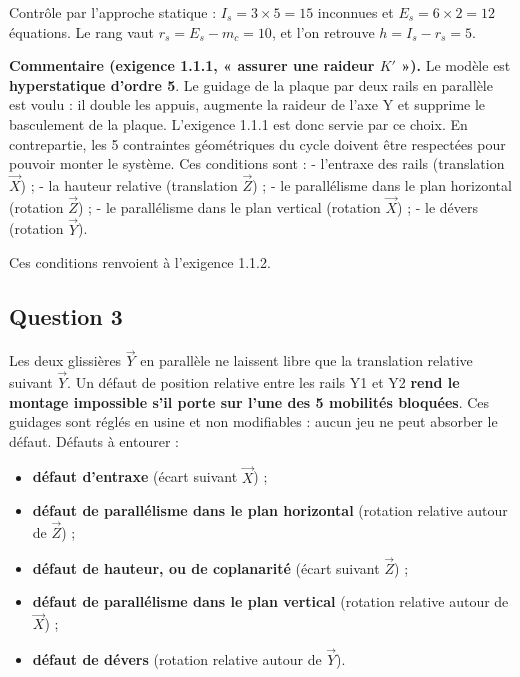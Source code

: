 \documentclass[11pt,a4paper]{article}
\providecommand{\tightlist}{\setlength{\itemsep}{0pt}\setlength{\parskip}{0pt}}
\newcommand{\equationajustee}[1]{%
  \sbox{\boiteequation}{$\displaystyle #1$}%
  \ifdim\wd\boiteequation>\linewidth
    \[\resizebox{\linewidth}{!}{\usebox{\boiteequation}}\]%
  \else
    \[#1\]%
  \fi}
\begin{document}
\equationajustee{\boxed{h = 5}}

Contrôle par l'approche statique : \(I_s = 3\times5 = 15\) inconnues et \(E_s = 6\times2 = 12\) équations. Le rang vaut \(r_s = E_s - m_c = 10\), et l'on retrouve \(h = I_s - r_s = 5\).

\textbf{Commentaire (exigence 1.1.1, « assurer une raideur \(K'\) »).} Le modèle est \textbf{hyperstatique d'ordre 5}. Le guidage de la plaque par deux rails en parallèle est voulu : il double les appuis, augmente la raideur de l'axe Y et supprime le basculement de la plaque. L'exigence 1.1.1 est donc servie par ce choix. En contrepartie, les 5 contraintes géométriques du cycle doivent être respectées pour pouvoir monter le système. Ces conditions sont :
- l'entraxe des rails (translation \(\vec X\)) ;
- la hauteur relative (translation \(\vec Z\)) ;
- le parallélisme dans le plan horizontal (rotation \(\vec Z\)) ;
- le parallélisme dans le plan vertical (rotation \(\vec X\)) ;
- le dévers (rotation \(\vec Y\)).

Ces conditions renvoient à l'exigence 1.1.2.

\hypertarget{question-3}{%
\subsection{Question 3}\label{question-3}}

Les deux glissières \(\vec Y\) en parallèle ne laissent libre que la translation relative suivant \(\vec Y\). Un défaut de position relative entre les rails Y1 et Y2 \textbf{rend le montage impossible s'il porte sur l'une des 5 mobilités bloquées}. Ces guidages sont réglés en usine et non modifiables : aucun jeu ne peut absorber le défaut. Défauts à entourer :

\begin{itemize}
\tightlist
\item
  \textbf{défaut d'entraxe} (écart suivant \(\vec X\)) ;
\item
  \textbf{défaut de parallélisme dans le plan horizontal} (rotation relative autour de \(\vec Z\)) ;
\item
  \textbf{défaut de hauteur, ou de coplanarité} (écart suivant \(\vec Z\)) ;
\item
  \textbf{défaut de parallélisme dans le plan vertical} (rotation relative autour de \(\vec X\)) ;
\item
  \textbf{défaut de dévers} (rotation relative autour de \(\vec Y\)).
\end{itemize}
\end{document}
